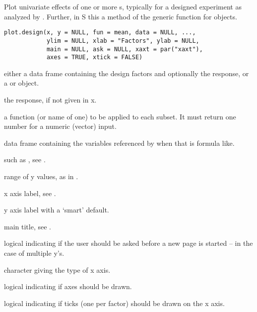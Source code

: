 %
\begin{Description}\relax
Plot univariate effects of one or more s,
typically for a designed experiment as analyzed by .
Further, in S this a method of the  generic function
for  objects.
\end{Description}
%
\begin{Usage}
\begin{verbatim}
plot.design(x, y = NULL, fun = mean, data = NULL, ...,
            ylim = NULL, xlab = "Factors", ylab = NULL,
            main = NULL, ask = NULL, xaxt = par("xaxt"),
            axes = TRUE, xtick = FALSE)
\end{verbatim}
\end{Usage}
%
\begin{Arguments}
\begin{ldescription}
\item[\code{x}] either a data frame containing the design factors and
optionally the response, or a  or
 object.
\item[\code{y}] the response, if not given in x.
\item[\code{fun}] a function (or name of one) to be applied to each
subset.  It must return one number for a numeric (vector) input.
\item[\code{data}] data frame containing the variables referenced by 
when that is formula like.
\item[\code{...}]  such as ,
see .
\item[\code{ylim}] range of y values, as in .
\item[\code{xlab}] x axis label, see .
\item[\code{ylab}] y axis label with a `smart' default.
\item[\code{main}] main title, see .
\item[\code{ask}] logical indicating if the user should be asked before a new
page is started -- in the case of multiple y's.
\item[\code{xaxt}] character giving the type of x axis.
\item[\code{axes}] logical indicating if axes should be drawn.
\item[\code{xtick}] logical indicating if ticks (one per factor) should
be drawn on the x axis.
\end{ldescription}
\end{Arguments}
